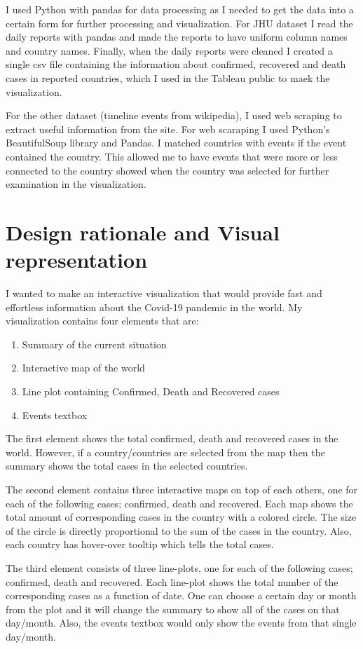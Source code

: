 \documentclass[11pt]{article}
\begin{document}
I used Python with pandas for data processing as I needed to get the data into a certain form for further processing and visualization. For JHU dataset I read the daily reports with pandas and made the reports to have uniform column names and country names. Finally, when the daily reports were cleaned I created a single csv file containing the information about confirmed, recovered and death cases in reported countries, which I used in the Tableau public to maek the visualization.

For the other dataset (timeline events from wikipedia), I used web scraping to extract useful information from the site. For web scaraping I used Python's BeautifulSoup library and Pandas. I matched countries with events if the event contained the country. This allowed me to have events that were more or less connected to the country showed when the country was selected for further examination in the visualization.


\section{Design rationale and Visual representation}
I wanted to make an interactive visualization that would provide fast and effortless information about the Covid-19 pandemic in the world. My visualization contains four elements that are:
\begin{enumerate}
\item
Summary of the current situation
\item
Interactive map of the world
\item
Line plot containing Confirmed, Death and Recovered cases
\item
Events textbox
\end{enumerate}

The first element shows the total confirmed, death and recovered cases in the world. However, if a country/countries are selected from the map then the summary shows the total cases in the selected countries.

The second element contains three interactive maps on top of each others, one for each of the following cases; confirmed, death and recovered. Each map shows the total amount of corresponding cases in the country with a colored circle. The size of the circle is directly proportional to the sum of the cases in the country. Also, each country has hover-over tooltip which tells the total cases.

The third element consists of three line-plots, one for each of the following cases; confirmed, death and recovered. Each line-plot shows the total number of the corresponding cases as a function of date. One can choose a certain day or month from the plot and it will change the summary to show all of the cases on that day/month. 
Also, the events textbox would only show the events from that single day/month.
\end{document}
